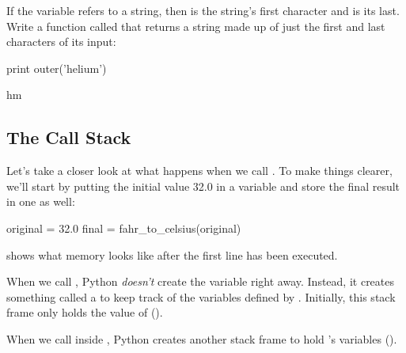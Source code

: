 \begin{challenge}
  If the variable  refers to a string, then 
  is the string's first character and  is its last.
  Write a function called  that returns a string made up
  of just the first and last characters of its input:

\begin{VerbIn}
print outer('helium')
\end{VerbIn}

\begin{VerbOut}
hm
\end{VerbOut}
\end{challenge}

\subsection{The Call Stack}

Let's take a closer look at what happens when we call
. To make things clearer, we'll start by
putting the initial value 32.0 in a variable and store the final result
in one as well:

\begin{VerbIn}
original = 32.0
final = fahr_to_celsius(original)
\end{VerbIn}


 shows what memory looks like after the first line has
been executed.

When we call , Python \emph{doesn't} create
the variable  right away. Instead, it creates something
called a  to keep track of the
variables defined by . Initially, this stack
frame only holds the value of  ().


When we call  inside
, Python creates another stack frame to hold
's variables ().


